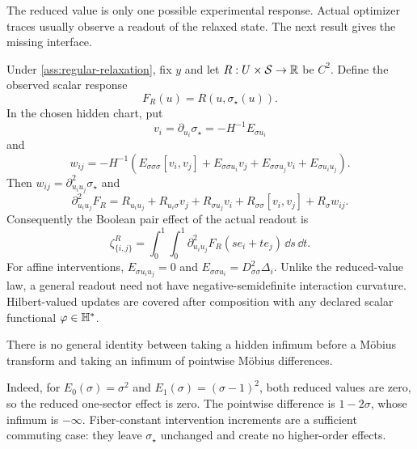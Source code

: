 The reduced value is only one possible experimental response.  Actual optimizer traces usually observe a readout of the relaxed state.  The next result gives the missing interface.

\begin{theorem}
\label{thm:readout-interaction-transfer}
Under \cref{ass:regular-relaxation}, fix $y$ and let $R:U\times\mathcal S\to\mathbb R$ be $C^2$.  Define the observed scalar response
\[
F_R(u)=R(u,\sigma_\star(u)).
\]
In the chosen hidden chart, put
\[
v_i=\partial_{u_i}\sigma_\star=-H^{-1}E_{\sigma u_i}
\]
and
\begin{equation}
w_{ij}=-H^{-1}\!\left(
E_{\sigma\sigma\sigma}[v_i,v_j]
+E_{\sigma\sigma u_i}v_j
+E_{\sigma\sigma u_j}v_i
+E_{\sigma u_i u_j}
\right).
\label{eq:second-hidden-response}
\end{equation}
Then $w_{ij}=\partial^2_{u_i u_j}\sigma_\star$ and
\begin{equation}
\boxed{
\partial^2_{u_i u_j}F_R
=R_{u_i u_j}+R_{u_i\sigma}v_j+R_{\sigma u_j}v_i
+R_{\sigma\sigma}[v_i,v_j]+R_\sigma w_{ij}.}
\label{eq:readout-interaction-transfer}
\end{equation}
Consequently the Boolean pair effect of the actual readout is
\begin{equation}
\zeta^R_{\{i,j\}}
=\int_0^1\!\int_0^1
\partial^2_{u_i u_j}F_R(se_i+te_j)\,\dd s\,\dd t.
\label{eq:readout-mobius-integral}
\end{equation}
For affine interventions, $E_{\sigma u_i u_j}=0$ and
$E_{\sigma\sigma u_i}=D^2_{\sigma\sigma}\Delta_i$.  Unlike the reduced-value law, a general readout need not have negative-semidefinite interaction curvature.  Hilbert-valued updates are covered after composition with any declared scalar functional $\varphi\in\mathbb H^*$.
\end{theorem}

\begin{proposition}
\label{prop:reduction-mobius-noncommutation}
There is no general identity between taking a hidden infimum before a M\"obius transform and taking an infimum of pointwise M\"obius differences.
\end{proposition}

Indeed, for $E_0(\sigma)=\sigma^2$ and $E_1(\sigma)=(\sigma-1)^2$, both reduced values are zero, so the reduced one-sector effect is zero.  The pointwise difference is $1-2\sigma$, whose infimum is $-\infty$.  Fiber-constant intervention increments are a sufficient commuting case: they leave $\sigma_\star$ unchanged and create no higher-order effects.

